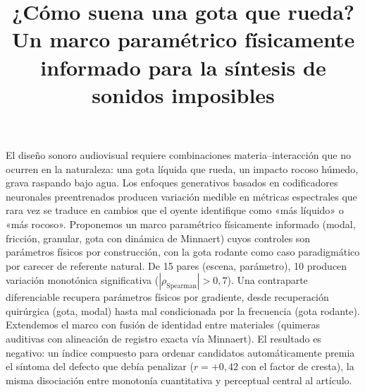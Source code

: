 \documentclass[a4paper,11pt,twoside]{article}
\title{¿Cómo suena una gota que rueda? Un marco paramétrico físicamente informado para la síntesis de sonidos imposibles}
\begin{document}
\maketitle


\begin{resumen}
El diseño sonoro audiovisual requiere combinaciones materia--interacción que no ocurren en la naturaleza: una gota líquida que rueda, un impacto rocoso húmedo, grava raspando bajo agua. Los enfoques generativos basados en codificadores neuronales preentrenados producen variación medible en métricas espectrales que rara vez se traduce en cambios que el oyente identifique como «más líquido» o «más rocoso». Proponemos un marco paramétrico físicamente informado (modal, fricción, granular, gota con dinámica de Minnaert) cuyos controles son parámetros físicos por construcción, con la gota rodante como caso paradigmático por carecer de referente natural. De 15 pares (escena, parámetro), 10 producen variación monotónica significativa ($|\rho_\mathrm{Spearman}| > 0,7$). Una contraparte diferenciable recupera parámetros físicos por gradiente, desde recuperación quirúrgica (gota, modal) hasta mal condicionada por la frecuencia (gota rodante). Extendemos el marco con fusión de identidad entre materiales (quimeras auditivas con alineación de registro exacta vía Minnaert). El resultado es negativo: un índice compuesto para ordenar candidatos automáticamente premia el síntoma del defecto que debía penalizar ($r=+0,42$ con el factor de cresta), la misma disociación entre monotonía cuantitativa y perceptual central al artículo.
\end{resumen}

\end{document}
